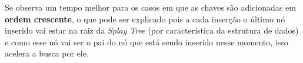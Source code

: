 Se observa um tempo melhor para os casos em que as chaves são adicionadas em \textbf{ordem crescente}, o que pode ser explicado pois a cada inserção o último nó inserido vai estar na raiz da \textit{Splay Tree} (por característica da estrutura de dados) e como esse nó vai ser o pai do nó que está sendo inserido nesse momento, isso acelera a busca por ele.
